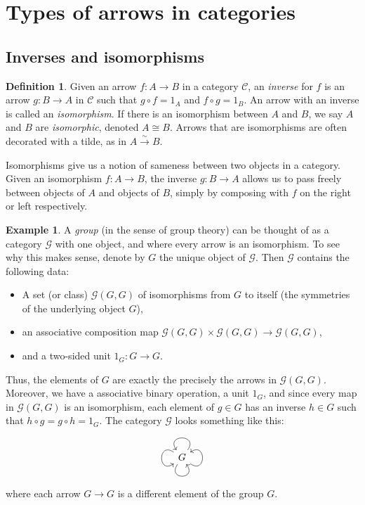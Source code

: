 \documentclass[10pt,oneside]{book}
\def\~#1{\mathscr{#1}}
\newcommand{\isom}{\xrightarrow{\sim}}
\theoremstyle{plain}
\theoremstyle{definition}
\newtheorem{defn}[thm]{Definition}
\newtheorem{ex}[thm]{Example}
\theoremstyle{remark}
\numberwithin{equation}{section}
\numberwithin{figure}{section}
\begin{document}
\section{Types of arrows in categories}

\subsection*{Inverses and isomorphisms}
\begin{defn}\label{defn: inverse_isom}
    Given an arrow $f: A \to B$ in a category $\~C$, an \emph{inverse} for $f$ is an arrow $g: B \to  A$ in $\~C$ such that $g \circ f = 1_A$ and $f \circ g = 1_B$. An arrow with an inverse is called an \emph{isomorphism}. If there is an isomorphism between $A$ and $B$, we say $A$ and $B$ are \emph{isomorphic}, denoted $A \cong B$. Arrows that are isomorphisms are often decorated with a tilde, as in $A \isom B$.
\end{defn}

Isomorphisms give us a notion of sameness between two objects in a category. Given an isomorphism $f: A \to B$, the inverse $g: B \to A$ allows us to pass freely between objects of $A$ and objects of $B$, simply by composing with $f$ on the right or left respectively.  

\begin{ex}
\label{ex:group}
A \emph{group} (in the sense of group theory) can be thought of as a category $\~G$ with one object, and where every arrow is an isomorphism. To see why this makes sense, denote by $G$ the unique object of $\~G$. Then $\~G$ contains the following data:
\begin{itemize}
    \item A set (or class) $\~G(G, G)$ of isomorphisms from $G$ to itself (the symmetries of the underlying object $G$),
    \item an associative composition map $\~G(G, G) \times \~G(G, G) \to \~G(G, G)$,
    \item and a two-sided unit $1_G: G \to G$.
\end{itemize}
Thus, the elements of $G$ are exactly the precisely the arrows in $\~G(G, G)$. Moreover, we have a associative binary operation, a unit $1_G$, and since every map in $\~G(G, G)$ is an isomorphism, each element of $g \in G$ has an inverse $h \in G$ such that $h \circ g = g \circ h = 1_G$. The category $\~G$ looks something like this:
\[\begin{tikzcd}
G \arrow[loop, distance=2em, in=35, out=325] \arrow[loop, distance=2em, in=215, out=145] \arrow[loop, distance=2em, in=305, out=235] \arrow[loop, distance=2em, in=125, out=55]
\end{tikzcd}\]
where each arrow $G \to G$ is a different element of the group $G$.
\end{ex}
\end{document}
